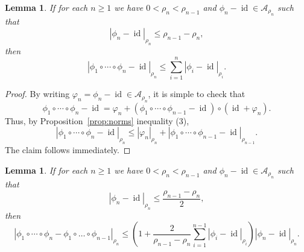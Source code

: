 \documentclass[12pt,reqno,a4paper]{amsart}%
\numberwithin{equation}{section}
\newtheorem{lemma}[theorem]{Lemma}
\newcommand{\A}{{\mathcal A}}
\newcommand{\id}  {\operatorname{id}}
\newcommand{\tcm}{\textcolor{magenta}}
\begin{document}
%
%
%
%
%



\begin{lemma}\label{lemma Hn-id vf v1}
If for each $n\geq1$ we have $0<\rho_{n}<\rho_{n-1}$ and $\phi_n-\id\in\A_{\rho_n}$  such that
$$
|\phi_n-\id|_{\rho_n}\leq \rho_{n-1}-\rho_n,
$$ 
then
$$
|\phi_1\circ\cdots\circ \phi_n -\id|_{\rho_n}\leq \sum_{i=1}^n|\phi_i-\id|_{\rho_i}.
$$
\end{lemma}



\begin{proof}
By writing $\varphi_n=\phi_n-\id \in\A_{\rho_n}$, it is simple to check that
$$
\phi_1\circ\cdots\circ \phi_n-\id=\varphi_n+(\phi_1\circ\cdots\circ \phi_{n-1}-\id)\circ(\id+\varphi_n).
$$
Thus, by Proposition~\ref{prop:norms} inequality (3),
$$
|\phi_1\circ\cdots\circ \phi_n-\id|_{\rho_n}\leq |\varphi_n|_{\rho_n}+|\phi_1\circ\cdots\circ \phi_{n-1}-\id|_{\rho_{n-1}}.
$$
The claim follows immediately.
\end{proof}



\begin{lemma}\label{lemma Hn-Hn-1 v1}
If for each $n\geq1$ we have $0<\rho_{n}<\rho_{n-1}$ and $\phi_n-\id\in\A_{\rho_n}$ such that
$$
|\phi_n-\id|_{\rho_n}
\leq \frac{\rho_{n-1}-\rho_n}{2} ,
$$
then 
\begin{equation}\label{estimate Hn-Hn-1 v1}
|\phi_1\circ\cdots\circ \phi_{n}-\phi_1\circ\dots\circ \phi_{n-1}|_{\rho_{n}}
\leq
\left(1+ 
\frac{2}{\rho_{n-1}-\rho_n}
\sum_{i=1}^{n-1}
|\phi_i-\id|_{\rho_i}
\right)
 |\phi_{n}-\id|_{\rho_n}.
\end{equation}
\end{lemma}
\end{document}
